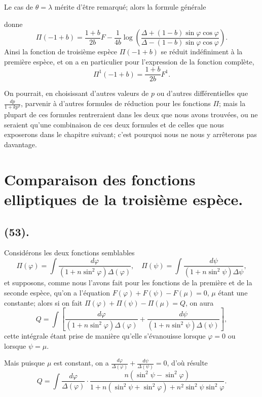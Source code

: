 \documentclass{article}
\begin{document}
Le cas de $\theta=\lambda$ mérite d'être remarqué; alors la formule générale

donne
\[ \Pi(-1+b)=\frac{1+b}{2b}F-\frac{1}{4b}\log\left(\frac{\Delta+(1-b)\sin\varphi\cos\varphi}{\Delta-(1-b)\sin\varphi\cos\varphi}\right). \]
Ainsi la fonction de troisième espèce $\Pi(-1+b)$ se réduit indéfiniment à la première espèce, et on a en particulier pour l'expression de la fonction complète,
\[ \Pi^{1}(-1+b)=\frac{1+b}{2b}F^{1}. \]

On pourrait, en choisissant d'autres valeurs de $p$ ou d'autres différentielles que $\frac{dp}{1+kp^{2}}$, parvenir à d'autres formules de réduction pour les fonctions $\Pi$; mais la plupart de ces formules rentreraient dans les deux que nous avons trouvées, ou ne seraient qu'une combinaison de ces deux formules et de celles que nous exposerons dans le chapitre suivant; c'est pourquoi nous ne nous y arrêterons pas davantage.

\section*{Comparaison des fonctions elliptiques de la troisième espèce.}

\subsection*{(53).}

Considérons les deux fonctions semblables
\[ \Pi(\varphi)=\int\frac{d\varphi}{(1+n\sin^{2}\varphi)\Delta(\varphi)},\quad \Pi(\psi)=\int\frac{d\psi}{(1+n\sin^{2}\psi)\Delta\psi}, \]
et supposons, comme nous l'avons fait pour les fonctions de la première et de la seconde espèce, qu'on a l'équation $F(\varphi)+F(\psi)-F(\mu)=0$, $\mu$ étant une constante; alors si on fait $\Pi(\varphi)+\Pi(\psi)-\Pi(\mu)=Q$, on aura
\[ Q=\int\left[\frac{d\varphi}{(1+n\sin^{2}\varphi)\Delta(\varphi)}+\frac{d\psi}{(1+n\sin^{2}\psi)\Delta(\psi)}\right], \]
cette intégrale étant prise de manière qu'elle s'évanouisse lorsque $\varphi=0$ ou lorsque $\psi=\mu$.

Mais puisque $\mu$ est constant, on a $\frac{d\varphi}{\Delta(\varphi)}+\frac{d\psi}{\Delta(\psi)}=0$, d'où résulte
\[ Q=\int\frac{d\varphi}{\Delta(\varphi)}\cdot\frac{n(\sin^{2}\psi-\sin^{2}\varphi)}{1+n(\sin^{2}\psi+\sin^{2}\varphi)+n^{2}\sin^{2}\psi\sin^{2}\varphi}. \]
\end{document}
